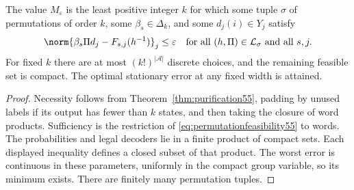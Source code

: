 \begin{theorem}\label{thm:stationaryminimum55}
The value $M_\varepsilon$ is the least positive integer $k$ for which some tuple $\sigma$ of permutations of order $k$, some $\beta_s\in\Delta_k$, and some $d_j(i)\in Y_j$ satisfy
\begin{equation}\label{eq:permutationfeasibility55}
 \norm{\beta_s\Pi d_j-F_{s,j}(h^{-1})}_j\le\varepsilon
 \quad\text{for all }(h,\Pi)\in\mathcal L_\sigma\text{ and all }s,j.
\end{equation}
For fixed $k$ there are at most $(k!)^{|\mathcal A|}$ discrete choices, and the remaining feasible set is compact. The optimal stationary error at any fixed width is attained.
\end{theorem}
\begin{proof}
Necessity follows from Theorem~\ref{thm:purification55}, padding by unused labels if its output has fewer than $k$ states, and then taking the closure of word products. Sufficiency is the restriction of \eqref{eq:permutationfeasibility55} to words. The probabilities and legal decoders lie in a finite product of compact sets. Each displayed inequality defines a closed subset of that product. The worst error is continuous in these parameters, uniformly in the compact group variable, so its minimum exists. There are finitely many permutation tuples.
\end{proof}

